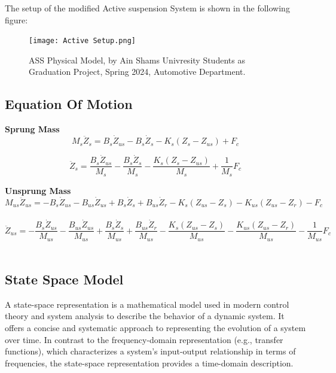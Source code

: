 The setup of the modified Active suspension System is shown in the following figure:

\begin{figure}[H]
	\centering
	\texttt{[image: Active Setup.png]}
	\caption{ASS Physical Model, by Ain Shams Univresity Students as Graduation Project, Spring 2024, Automotive Department.}
	\label{fig:Active schematic diagram}	
\end{figure}


\newpage
\subsection{Equation Of Motion}

\textbf{Sprung Mass}
\begin{equation}
M_s\ddot{Z}_s = B_s\dot{Z}_{us} - B_s\dot{Z}_s - K_s(Z_s - Z_{us}) + F_c
\end{equation}

\begin{equation}
\ddot{Z}_s = \frac{B_s\dot{Z}_{us}}{M_s} - \frac{B_s\dot{Z}_s}{M_s} - \frac{K_s(Z_s - Z_{us})}{M_s} + \frac{1}{M_s}F_c
\end{equation}

\textbf{Unsprung Mass}
\begin{equation}
M_{us}\ddot{Z}_{us} = -B_s\dot{Z}_{us} - B_{us}\dot{Z}_{us} + B_s\dot{Z}_s + B_{us}\dot{Z}_r - K_s(Z_{us} - Z_s) - K_{us}(Z_{us} - Z_r) - F_c
\end{equation}\\


\begin{equation}
\ddot{Z}_{us} = -\frac{B_s\dot{Z}_{us}}{M_{us}} - \frac{B_{us}\dot{Z}_{us}}{M_{us}} + \frac{B_s\dot{Z}_s}{M_{us}} + \frac{B_{us}\dot{Z}_r}{M_{us}} - \frac{K_s(Z_{us} - Z_s)}{M_{us}} - \frac{K_{us}(Z_{us} - Z_r)}{M_{us}} - \frac{1}{M_{us}}F_c
\end{equation}\\

\subsection{State Space Model}
A state-space representation is a mathematical model used in modern control theory and system analysis to describe the behavior of a dynamic system. It offers a concise and systematic approach to representing the evolution of a system over time. In contrast to the frequency-domain representation (e.g., transfer functions), which characterizes a system's input-output relationship in terms of frequencies, the state-space representation provides a time-domain description.\\

